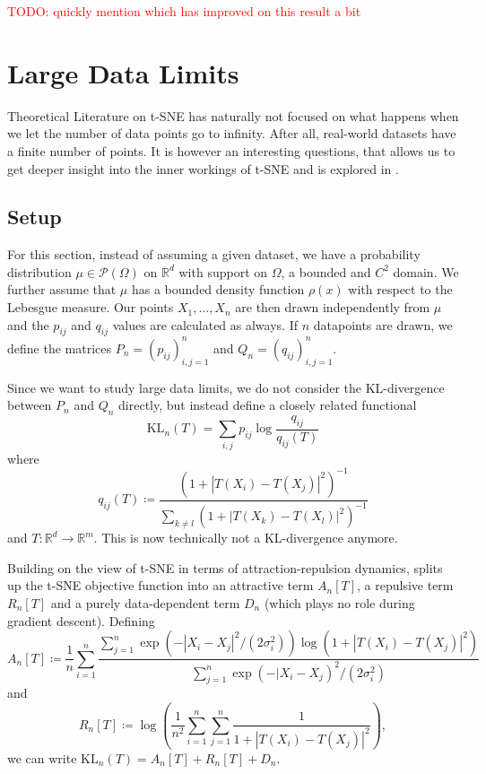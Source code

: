 \textcolor{red}{TODO: quickly mention \cite{Arora18} which has improved on this result a bit}

\section{Large Data Limits}
Theoretical Literature on t-SNE has naturally not focused on what happens when we let the number of data points go to infinity. After all, real-world datasets have a finite number of points. It is however an interesting questions, that allows us to get deeper insight into the inner workings of t-SNE and is explored in \cite{murray2024largedatalimitsscaling}. 

\subsection{Setup}
For this section, instead of assuming a given dataset, we have a probability distribution $\mu \in \mathcal{P}(\Omega)$ on $\mathbb{R}^d$ with support on $\Omega$, a bounded and $C^2$ domain. 
We further assume that $\mu$ has a bounded density function $\rho(x)$ with respect to the Lebesgue measure. 
Our points $X_1, \dots, X_n$ are then drawn independently from $\mu$ and the $p_{ij}$ and $q_{ij}$ values are calculated as always. 
If $n$ datapoints are drawn, we define the matrices $P_n = (p_{ij})_{i,j=1}^n$ and $Q_n = (q_{ij})_{i,j=1}^n$. 

Since we want to study large data limits, we do not consider the KL-divergence between $P_n$ and $Q_n$ directly, but instead define a closely related functional 
\begin{equation}
    \text{KL}_n (T) = \sum_{i,j} p_{ij} \log \frac{q_{ij}}{q_{ij}(T)}
\end{equation}
where 
\begin{equation}
    q_{ij}(T) \coloneq \frac{(1+ |T(X_i) - T(X_j)|^2)^{-1}}{\sum_{k \neq l} (1+ |T(X_k) - T(X_l)|^2)^{-1}}
\end{equation}
and $T: \mathbb{R}^d \to \mathbb{R}^m$. This is now technically not a KL-divergence anymore. 

Building on the view of t-SNE in terms of attraction-repulsion dynamics, \cite{murray2024largedatalimitsscaling} splits up the t-SNE objective function into an attractive term $A_n[T]$, a repulsive term $R_n[T]$ and a purely data-dependent term  $D_n$ (which plays no role during gradient descent). Defining 
\begin{equation}
    A_n[T] \coloneq \frac{1}{n} \sum_{i=1}^n \frac{\sum_{j=1}^n \exp(-|X_i - X_j|^2/(2\sigma_i^2)) \log(1+ |T(X_i) - T(X_j)|^2)}{\sum_{j=1}^n \exp(-|X_i - X_j)^2 / (2\sigma_i^2)}
\end{equation}
and 
\begin{equation}
    R_n[T] \coloneq \log \left( \frac{1}{n^2} \sum_{i=1}^n \sum_{j=1}^n \frac{1}{1+ |T(X_i) - T(X_j)|^2} \right), 
\end{equation}
we can write $\text{KL}_n (T) = A_n[T] + R_n[T] + D_n$. 

